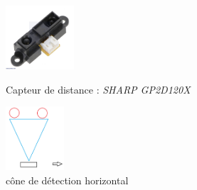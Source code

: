 \documentclass[a4paper,11pt]{article}
\begin{document}
\begin{figure}[H]
    \begin{minipage}[c]{.40\linewidth}
    \centering
    \includegraphics[height = 90]{Capteurs_d.jpg}
    \caption{Capteur de distance : \textit{SHARP GP2D120X} \cite{captdist}}
    \label{fig:captdist}
    \end{minipage}
    \hfill
    \begin{minipage}[c]{.40\linewidth}
    \centering
    \includegraphics[height = 90]{capteurs_horizontaux.png}
    \caption{cône de détection horizontal}
    \label{fig:cônedetect}
    \end{minipage}
\end{figure}
\end{document}
